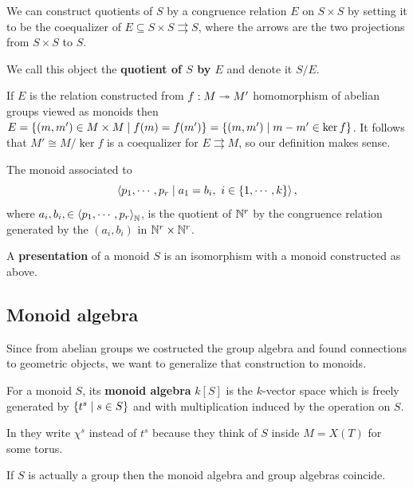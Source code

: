 \begin{fact}[]
We can construct quotients of $S$ by a congruence relation $E$ on $S\times S$ by setting it to be the coequalizer of $E\subseteq S\times S\rightrightarrows S$, where the arrows are the two projections from $S\times S$ to $S$.

We call this object the \textbf{quotient of $S$ by $E$} and denote it $S/E$.
\end{fact}

\begin{remark}
If $E$ is the relation constructed from $f:M\twoheadrightarrow M'$ homomorphism of abelian groups viewed as monoids then $E=\left\{{(m,m')\in M\times M\mid f(m)=f(m')}\right\}=\left\{{(m,m')\mid m-m'\in \ker f}\right\}$. It follows that $M'\cong M/\ker f$ is a coequalizer for $E\rightrightarrows M$, so our definition makes sense.
\end{remark}


\begin{definition}
The monoid associated to
\[\left\langle {p_1,\cdots, p_r\mid a_1=b_i,\ i\in\left\{{1,\cdots, k}\right\}}\right\rangle,\]
where $a_i,b_i,\in \left\langle {p_1,\cdots, p_r}\right\rangle_{\mathbb{N}}$, is the quotient of $\mathbb{N}^r$ by the congruence relation generated by the $(a_i,b_i)$ in $\mathbb{N}^r\times \mathbb{N}^r$.

A \textbf{presentation} of a monoid $S$ is an isomorphism with a monoid constructed as above.
\end{definition}





\subsection{Monoid algebra}
Since from abelian groups we costructed the group algebra and found connections to geometric objects, we want to generalize that construction to monoids.

\begin{definition}
For a monoid $S$, its \textbf{monoid algebra} $k[S]$ is the $k$-vector space which is freely generated by $\left\{{t^s\mid s\in S}\right\}$ and with multiplication induced by the operation on $S$.
\end{definition}


\begin{remark}
In \cite{cox2011toric} they write $\chi^s$ instead of $t^s$ because they think of $S$ inside $M=X(T)$ for some torus.
\end{remark}

\begin{remark}
If $S$ is actually a group then the monoid algebra and group algebras coincide.
\end{remark}


